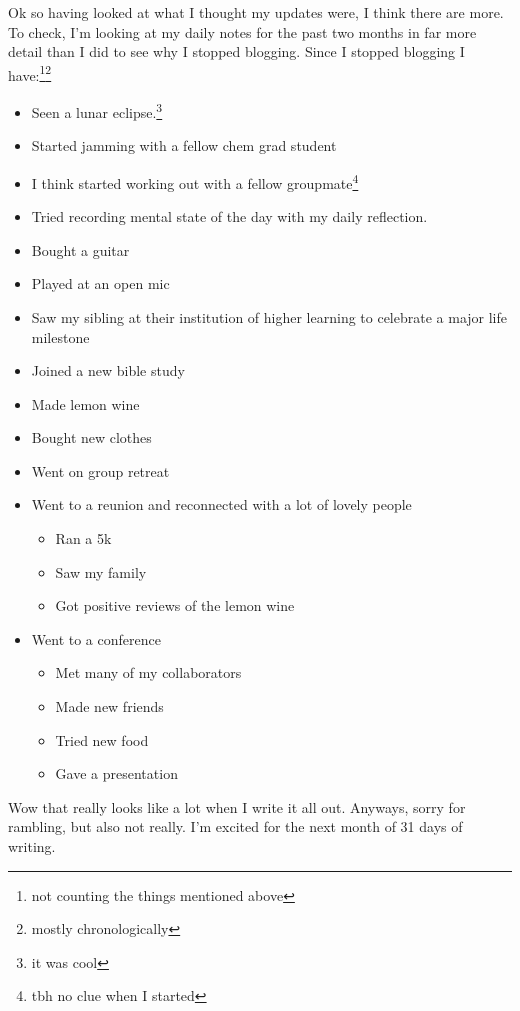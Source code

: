 \documentclass[12pt]{article}[titlepage]
\renewcommand{\,}{\textsuperscript{,}}
\begin{document}
Ok so having looked at what I thought my updates were, I think there are more.
To check, I'm looking at my daily notes for the past two months in far more detail than I did to see why I stopped blogging.
Since I stopped blogging I have:\footnote{not counting the things mentioned above}\footnote{mostly chronologically}

\begin{itemize}
\item Seen a lunar eclipse.\footnote{it was cool}
\item Started jamming with a fellow chem grad student
\item I think started working out with a fellow groupmate\footnote{tbh no clue when I started}
\item Tried recording mental state of the day with my daily reflection.
\item Bought a guitar
\item Played at an open mic
\item Saw my sibling at their institution of higher learning to celebrate a major life milestone
\item Joined a new bible study
\item Made lemon wine
\item Bought new clothes
\item Went on group retreat
\item Went to a reunion and reconnected with a lot of lovely people
\begin{itemize}
\item Ran a 5k
\item Saw my family
\item Got positive reviews of the lemon wine
\end{itemize}
\item Went to a conference
\begin{itemize}
\item Met many of my collaborators
\item Made new friends
\item Tried new food
\item Gave a presentation
\end{itemize}
\end{itemize}

Wow that really looks like a lot when I write it all out.
Anyways, sorry for rambling, but also not really.
I'm excited for the next month of 31 days of writing.
\end{document}
